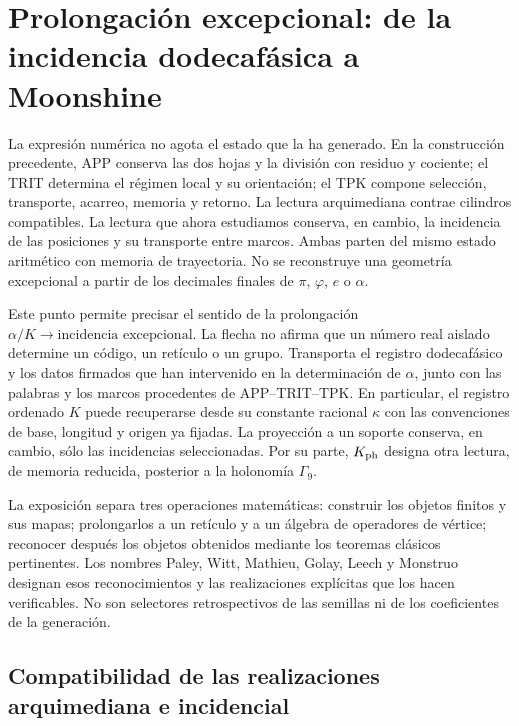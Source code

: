 \section{Prolongación excepcional: de la incidencia dodecafásica a Moonshine}
\label{exc:seccion}

La expresión numérica no agota el estado que la ha generado. En la
construcción precedente, APP conserva las dos hojas y la división con
residuo y cociente; el TRIT determina el régimen local y su orientación;
el TPK compone selección, transporte, acarreo, memoria y retorno. La
lectura arquimediana contrae cilindros compatibles. La lectura que ahora
estudiamos conserva, en cambio, la incidencia de las posiciones y su
transporte entre marcos. Ambas parten del mismo estado aritmético con
memoria de trayectoria. No se
reconstruye una geometría excepcional a partir de los decimales finales
de $\pi$, $\varphi$, $e$ o $\alpha$.

Este punto permite precisar el sentido de la prolongación
$\alpha/K\longrightarrow\text{incidencia excepcional}$. La flecha no
afirma que un número real aislado determine un código, un retículo o un
grupo. Transporta el registro dodecafásico y los datos firmados que han
intervenido en la determinación de $\alpha$, junto con las palabras y los
marcos procedentes de APP--TRIT--TPK. En particular, el registro ordenado
$K$ puede recuperarse desde su constante racional $\kappa$ con las
convenciones de base, longitud y origen ya fijadas. La proyección a un
soporte conserva, en cambio, sólo las incidencias seleccionadas.
Por su parte, $K_{\rm ph}$
designa otra lectura, de memoria reducida, posterior a la holonomía
$\Gamma_9$.

La exposición separa tres operaciones matemáticas: construir los objetos
finitos y sus mapas; prolongarlos a un retículo y a un álgebra de operadores
de vértice; reconocer después los objetos obtenidos mediante los teoremas
clásicos pertinentes. Los nombres Paley, Witt, Mathieu, Golay, Leech y
Monstruo designan esos reconocimientos y las realizaciones explícitas
que los hacen verificables. No son selectores retrospectivos de las
semillas ni de los coeficientes de la generación.





\subsection{Compatibilidad de las realizaciones arquimediana e incidencial}
\label{exc:doble-lectura}

